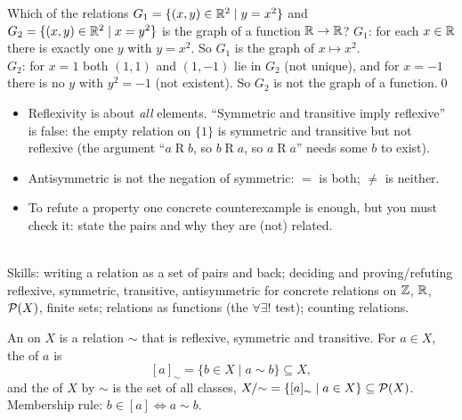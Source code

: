 \begin{hexample}[is it a function?]
Which of the relations $G_1=\{(x,y)\in\mathbb{R}^2\mid y=x^2\}$ and $G_2=\{(x,y)\in\mathbb{R}^2\mid x=y^2\}$ is the graph of a function $\mathbb{R}\to\mathbb{R}$?
\solution
$G_1$: for each $x\in\mathbb{R}$ there is exactly one $y$ with $y=x^2$. So $G_1$ is the graph of $x\mapsto x^2$.\\
$G_2$: for $x=1$ both $(1,1)$ and $(1,-1)$ lie in $G_2$ (not unique), and for $x=-1$ there is no $y$ with $y^2=-1$ (not existent). So $G_2$ is not the graph of a function.\qed
\end{hexample}

\begin{warn}
\begin{itemize}
\item Reflexivity is about \emph{all} elements. ``Symmetric and transitive imply reflexive'' is false: the empty relation on $\{1\}$ is symmetric and transitive but not reflexive (the argument ``$a\mathrel Rb$, so $b\mathrel Ra$, so $a\mathrel Ra$'' needs some $b$ to exist).
\item Antisymmetric is not the negation of symmetric: $=$ is both; $\neq$ is neither.
\item To refute a property one concrete counterexample is enough, but you must check it: state the pairs and why they are (not) related.
\end{itemize}
\end{warn}

\begin{planning}[5.1]
\quad {}\\[3pt]
Skills: writing a relation as a set of pairs and back; deciding and proving/refuting reflexive, symmetric, transitive, antisymmetric for concrete relations on $\mathbb{Z}$, $\mathbb{R}$, $\mathcal{P}(X)$, finite sets; relations as functions (the $\forall\exists!$ test); counting relations.
\end{planning}


\begin{key}
An  on $X$ is a relation $\sim$ that is reflexive, symmetric and transitive. For $a\in X$, the  of $a$ is
\[
[a]_\sim=\{b\in X\mid a\sim b\}\subseteq X,
\]
and the  of $X$ by $\sim$ is the set of all classes, $X/{\sim}=\{[a]_\sim\mid a\in X\}\subseteq\mathcal{P}(X)$. Membership rule: $b\in[a]\Leftrightarrow a\sim b$.
\end{key}

